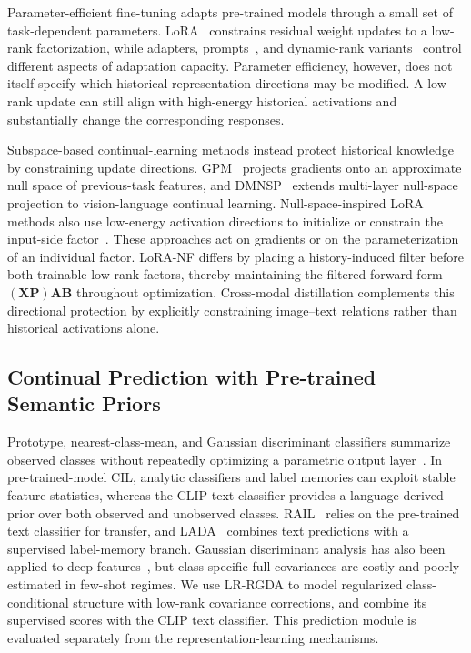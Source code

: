 Parameter-efficient fine-tuning adapts pre-trained models through a small set of task-dependent parameters. LoRA~\cite{hu2022lora} constrains residual weight updates to a low-rank factorization, while adapters, prompts~\cite{wang2022sprompts,yu2024moe}, and dynamic-rank variants~\cite{wang2024lora,lu2026codyra} control different aspects of adaptation capacity. Parameter efficiency, however, does not itself specify which historical representation directions may be modified. A low-rank update can still align with high-energy historical activations and substantially change the corresponding responses.

Subspace-based continual-learning methods instead protect historical knowledge by constraining update directions. GPM~\cite{saha2021gradient} projects gradients onto an approximate null space of previous-task features, and DMNSP~\cite{kang2025dynamic} extends multi-layer null-space projection to vision-language continual learning. Null-space-inspired LoRA methods also use low-energy activation directions to initialize or constrain the input-side factor~\cite{tang2026lora}. These approaches act on gradients or on the parameterization of an individual factor. LoRA-NF differs by placing a history-induced filter before both trainable low-rank factors, thereby maintaining the filtered forward form $(\mathbf{X}\mathbf{P})\mathbf{A}\mathbf{B}$ throughout optimization. Cross-modal distillation complements this directional protection by explicitly constraining image--text relations rather than historical activations alone.

\subsection{Continual Prediction with Pre-trained Semantic Priors}

Prototype, nearest-class-mean, and Gaussian discriminant classifiers summarize observed classes without repeatedly optimizing a parametric output layer~\cite{rebuffi2017icarl}. In pre-trained-model CIL, analytic classifiers and label memories can exploit stable feature statistics, whereas the CLIP text classifier provides a language-derived prior over both observed and unobserved classes. RAIL~\cite{xu2024rail} relies on the pre-trained text classifier for transfer, and LADA~\cite{luo2025lada} combines text predictions with a supervised label-memory branch. Gaussian discriminant analysis has also been applied to deep features~\cite{lee2018simple}, but class-specific full covariances are costly and poorly estimated in few-shot regimes. We use LR-RGDA to model regularized class-conditional structure with low-rank covariance corrections, and combine its supervised scores with the CLIP text classifier. This prediction module is evaluated separately from the representation-learning mechanisms.
